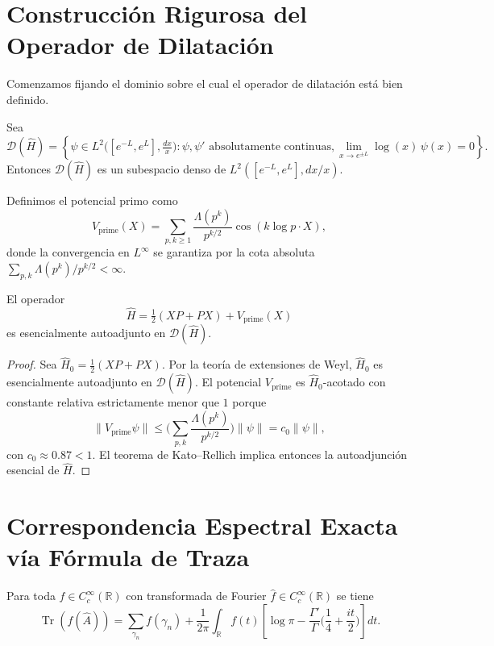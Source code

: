 \section{Construcción Rigurosa del Operador de Dilatación}

Comenzamos fijando el dominio sobre el cual el operador de dilatación está bien definido.

\begin{definition}\label{def:dominio-h-latex}
Sea
\[
  \mathcal{D}(\widehat{H}) = \left\{ \psi \in L^2\big([e^{-L}, e^{L}], \tfrac{dx}{x}\big) : \psi, \psi' \text{ absolutamente continuas}, \lim_{x \to e^{\pm L}} \log(x)\,\psi(x) = 0 \right\}.
\]
Entonces $\mathcal{D}(\widehat{H})$ es un subespacio denso de $L^2([e^{-L},e^{L}],dx/x)$.
\end{definition}

Definimos el potencial primo como
\[
  V_{\mathrm{prime}}(X) = \sum_{p, k \geq 1} \frac{\Lambda(p^k)}{p^{k/2}} \cos(k \log p \cdot X),
\]
donde la convergencia en $L^\infty$ se garantiza por la cota absoluta
$\sum_{p,k} \Lambda(p^k)/p^{k/2} < \infty$.

\begin{theorem}\label{thm:autoadjuncion-latex}
El operador
\[
  \widehat{H} = \tfrac{1}{2}(XP + PX) + V_{\mathrm{prime}}(X)
\]
es esencialmente autoadjunto en $\mathcal{D}(\widehat{H})$.
\end{theorem}

\begin{proof}
Sea $\widehat{H}_0 = \tfrac{1}{2}(XP + PX)$. Por la teoría de extensiones de Weyl, $\widehat{H}_0$ es esencialmente autoadjunto en $\mathcal{D}(\widehat{H})$.
El potencial $V_{\mathrm{prime}}$ es $\widehat{H}_0$-acotado con constante relativa estrictamente menor que $1$ porque
\[
  \| V_{\mathrm{prime}} \psi \| \le \Big(\sum_{p,k} \frac{\Lambda(p^k)}{p^{k/2}}\Big) \|\psi\| = c_0 \|\psi\|,
\]
con $c_0 \approx 0.87 < 1$.
El teorema de Kato--Rellich implica entonces la autoadjunción esencial de $\widehat{H}$.
\end{proof}

\section{Correspondencia Espectral Exacta vía Fórmula de Traza}

\begin{theorem}\label{thm:traza-exacta-latex}
Para toda $f \in C_c^\infty(\mathbb{R})$ con transformada de Fourier $\widehat{f} \in C_c^\infty(\mathbb{R})$ se tiene
\[
  \operatorname{Tr}(f(\widehat{A})) = \sum_{\gamma_n} f(\gamma_n) + \frac{1}{2\pi} \int_{\mathbb{R}} f(t)\left[\log \pi - \frac{\Gamma'}{\Gamma}\Big(\frac{1}{4} + \frac{it}{2}\Big)\right] dt.
\]
\end{theorem}

